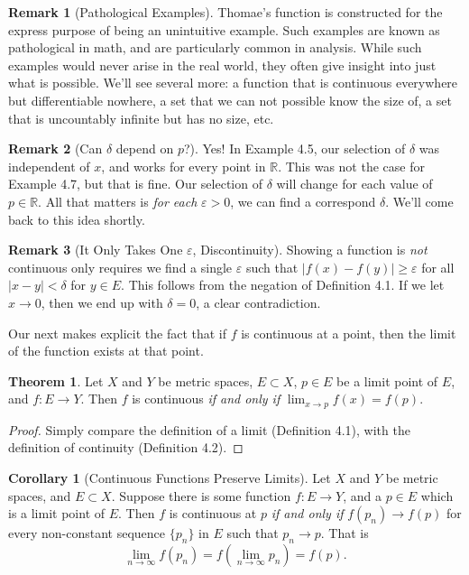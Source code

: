 \documentclass{article}
\newcommand{\R}{\mathbb{R}}
\theoremstyle{definition}
\newtheorem{theorem}{Theorem}[section]
\newtheorem{corollary}{Corollary}[section]
\newtheorem{remark}{Remark}[section]
\begin{document}
\begin{remark}[Pathological Examples]
	Thomae's function is constructed for the express purpose of being an unintuitive example. Such examples are known as pathological in math, and are particularly common in analysis. While such examples would never arise in the real world, they often give insight into just what is possible. We'll see several more: a function that is continuous everywhere but differentiable nowhere, a set that we can not possible know the size of, a set that is uncountably infinite but has no size, etc. 
\end{remark}
\begin{remark}[Can $\delta  $ depend on $p $?]
	Yes! In Example 4.5, our selection of $ \delta $ was independent of $ x $, and works for every point in $ \R $. This was not the case for Example 4.7, but that is fine. Our selection of $ \delta $ will change for each value of $ p\in\R $. All that matters is \textit{for each} $ \varepsilon>0 $, we can find a correspond $ \delta $. We'll come back to this idea shortly.  
\end{remark}
\begin{remark}[It Only Takes One $ \varepsilon $, Discontinuity]
Showing a function is \textit{not} continuous only requires we find a single $ \varepsilon $ such that $ |f(x)-f(y)|\ge\varepsilon $ for all $ |x-y|<\delta $ for $ y\in E $. This follows from the negation of Definition 4.1. If we let $ x\to0 $, then we end up with $ \delta=0 $, a clear contradiction. 
\end{remark}
Our next makes explicit the fact that if $ f $ is continuous at a point, then the limit of the function exists at that point.
\begin{theorem}
	Let $ X $ and $ Y $ be metric spaces,  $ E\subset X $, $ p \in E $ be a limit point of $ E $, and $ f:E\to Y $. Then $ f $ is continuous \textit{if and only if} $ \lim_{x\to p}f(x)=f(p) $.
\end{theorem}
\begin{proof}
	Simply compare the definition of a limit (Definition 4.1), with the definition of continuity (Definition 4.2).
\end{proof}
\begin{corollary}[Continuous Functions Preserve Limits]
		Let $ X $ and $ Y $ be metric spaces, and $ E\subset X $. Suppose there is some function $ f:E\to Y $, and a $ p\in E $ which is a limit point of $ E $. Then $ f $ is continuous at $ p $ \textit{if and only if} $ f(p_n)\to f(p) $ for every non-constant sequence $ \{p_n\} $ in $ E $ such that $ p_n\to p $. That is $$\lim\limits_{n\to \infty}f(p_n)=f\left(\lim\limits_{n\to\infty} p_n\right)=f(p) .$$
\end{corollary}
\end{document}
